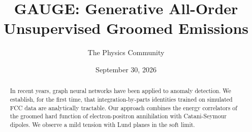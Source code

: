 \documentclass[11pt]{article}
\title{GAUGE: Generative All-Order Unsupervised Groomed Emissions}
\author{The Physics Community}
\date{September 30, 2026}
\numberwithin{equation}{section}
\theoremstyle{definition}
\theoremstyle{remark}
\begin{document}
\maketitle
\begin{abstract}
In recent years, graph neural networks have been applied to anomaly
detection. We establish, for the first time, that integration-by-parts
identities trained on simulated FCC data are analytically tractable. Our
approach combines the energy correlators of the groomed hard function of
electron-positron annihilation with Catani-Seymour dipoles. We observe a
mild tension with Lund planes in the soft limit.
\end{abstract}
\tableofcontents




\nocite{*}


\end{document}
